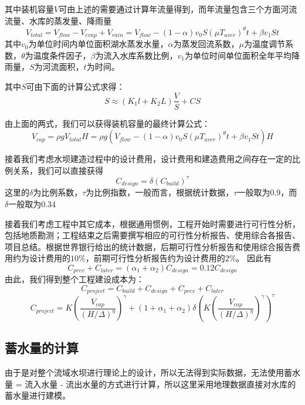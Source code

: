 \documentclass[nocover]{cumcmart}
\begin{document}
其中装机容量$V$可由上述的需要通过计算年流量得到，而年流量包含三个方面河流流量、水库的蒸发量、降雨量
\begin{equation}
V_{total} = V_{flow} - V_{evap} + V_{rain} = V_{flow} - (1-{\alpha})v_{0}S({\mu}T_{aver})^{\theta}t + {\beta}v_{1}St
\end{equation}
其中$v_{0}$为单位时间内单位面积湖水蒸发水量，$\alpha$为蒸发回流系数，$\mu$为温度调节系数，$\theta$为温度条件因子，$\beta$为流入水库系数比例，$v_{1}$为单位时间单位面积全年平均降雨量，$S$为河流面积，$t$为时间。

其中$S$可由下面的计算公式求得：
\begin{equation}
S \approx \left(K_{1}l + K_{2}L\right)\frac{V}{S} + CS
\end{equation}

由上面的两式，我们可以获得装机容量的最终计算公式：
\begin{equation}
V_{cap} = {\rho}gV_{total}H = {\rho}g(V_{flow} - (1 - {\alpha})v_{0}S({\mu}T_{aver})^{\theta}t + {\beta}v_{1}St)H
\end{equation}

接着我们考虑水坝建造过程中的设计费用，设计费用和建造费用之间存在一定的比例关系，我们可以直接获得
\begin{equation}
C_{design} = {\delta}(C_{build})^{\tau}
\end{equation}
这里的$\delta$为比例系数，$\tau$为比例指数，一般而言，根据统计数据，$\tau$一般取为0.9，而$\delta$一般取为0.34

接着我们考虑工程中其它成本，根据通用惯例，工程开始时需要进行可行性分析，包括地质勘测；工程结束之后需要撰写相应的可行性分析报告、使用综合各报告、项目总结。根据世界银行给出的统计数据，后期可行性分析报告和使用综合报告费用约为设计费用的$10\%$，前期可行性分析报告约为设计费用的$2\%$。
因此有
\begin{equation}
C_{prev} + C_{later}= (\alpha_{1} + \alpha_{2})C_{design} = 0.12C_{design}
\end{equation}
由此，我们得到整个工程建设成本为：
\begin{equation}
C_{project} = C_{build} + C_{design} + C_{prev} + C_{later} 
\end{equation}
\begin{equation}
C_{project} = K(\frac{V_{cap}}{(H/\Delta)^{\eta}})^{\gamma} + (1+\alpha_{1}+\alpha_{2}){\delta}(K(\frac{V_{cap}}{(H/\Delta)^{\eta}})^{\gamma})^{\tau}
\end{equation}

\subsection{蓄水量的计算}
由于是对整个流域水坝进行理论上的设计，所以无法得到实际数据，无法使用蓄水量 = 流入水量 - 流出水量的方式进行计算，所以这里采用地理数据直接对水库的蓄水量进行建模。
\end{document}
